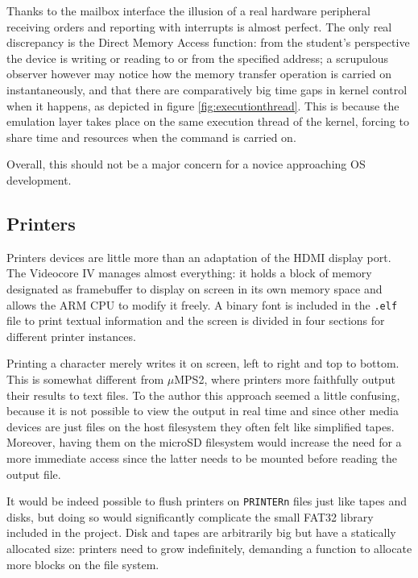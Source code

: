 \documentclass[12pt,a4paper,openright,twoside]{report}
\begin{document}
Thanks to the mailbox interface the illusion of a real hardware peripheral receiving
orders and reporting with interrupts is almost perfect. The only real discrepancy
is the Direct Memory Access function: from the student's perspective the device
is writing or reading to or from the specified address; a scrupulous observer
however may notice how the memory transfer operation is carried on instantaneously,
and that there are comparatively big time gaps in kernel control when it happens,
as depicted in figure \ref{fig:executionthread}.
This is because the emulation layer takes place on the same execution thread of
the kernel, forcing to share time and resources when the command is carried on.

Overall, this should not be a major concern for a novice approaching OS development.

\subsection{Printers}
Printers devices are little more than an adaptation of the HDMI display port.
The Videocore IV manages almost everything: it holds a block of memory designated
as framebuffer to display on screen in its own memory space and allows the ARM
CPU to modify it freely. A binary font is included in the {\tt .elf} file to 
print textual information and the screen is divided in four sections for different
printer instances.

Printing a character merely writes it on screen, left to right and top to bottom.
This is somewhat different from $\mu$MPS2, where printers more faithfully output
their results to text files. To the author this approach seemed a little confusing,
because it is not possible to view the output in real time and since other media
devices are just files on the host filesystem they often felt like simplified 
tapes. Moreover, having them on the microSD filesystem would increase the need
for a more immediate access since the latter needs to be mounted before reading
the output file.

It would be indeed possible to flush printers on {\tt PRINTERn} files just like
tapes and disks, but doing so would significantly complicate the small FAT32 
library included in the project. Disk and tapes are arbitrarily big but have a
statically allocated size: printers need to grow indefinitely, demanding a function
to allocate more blocks on the file system.
\end{document}
